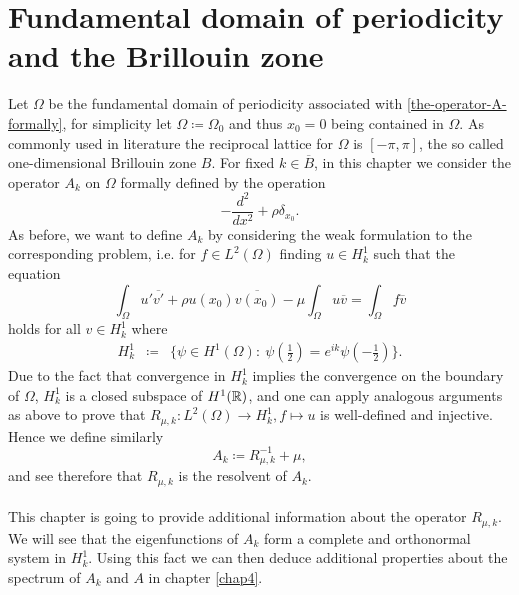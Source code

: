 \chapter{Fundamental domain of periodicity and the Brillouin zone}

Let $\Omega$ be the fundamental domain of periodicity associated with \eqref{the-operator-A-formally}, for simplicity let $\Omega \coloneqq \Omega_{0}$ and thus $x_{0} = 0$ being contained in $\Omega$. As commonly used in literature the reciprocal lattice for $\Omega$ is $[-\pi, \pi]$, the so called one-dimensional Brillouin zone $B$. For fixed $k \in \overline{B}$, in this chapter we consider the operator $A_{k}$ on $\Omega$ formally defined by the operation 
	\[ -\frac{d^{2}}{dx^{2}} + \rho \delta_{x_{0}}. \]
As before, we want to define $A_{k}$ by considering the weak formulation to the corresponding problem, i.e. for $f \in L^{2}(\Omega)$ finding $u \in H^{1}_{k}$ such that the equation
	\[ \int_{\Omega} u' \overline{v'} + \rho u(x_{0}) \overline{v(x_{0})} - \mu \int_{\Omega} u \overline{v} = \int_{\Omega} f \overline{v} \]
holds for all $v \in H^{1}_{k}$ where 
	\begin{eqnarray}
		H^{1}_{k} & \coloneqq & \Big\{ \psi \in H^{1}(\Omega): ~ \psi(\frac{1}{2}) = e^{ik} \psi(-\frac{1}{2}) \Big\}. \label{quasi-periodic-condition}
	\end{eqnarray}
Due to the fact that convergence in $H^{1}_{k}$ implies the convergence on the boundary of $\Omega$, $H^{1}_{k}$ is a closed subspace of $H^{1}(\mathbb{R})$, and one can apply analogous arguments as above to prove that $R_{\mu, k} \colon L^{2}(\Omega) \rightarrow H^{1}_{k}, f \mapsto u$ is well-defined and injective. Hence we define similarly
	\[ A_{k} \coloneqq R_{\mu, k}^{-1} + \mu, \] 
and see therefore that $R_{\mu, k}$ is the resolvent of $A_{k}$.	
~\\ ~\\
This chapter is going to provide additional information about the operator $R_{\mu, k}$. We will see that the eigenfunctions of $A_{k}$ form a complete and orthonormal system in $H^{1}_{k}$. Using this fact we can then deduce additional properties about the spectrum of $A_{k}$ and $A$ in chapter \ref{chap4}.

